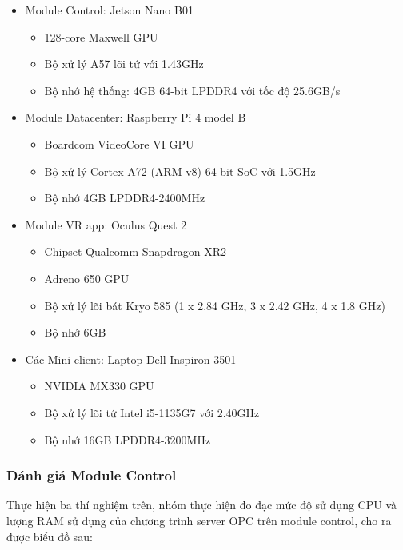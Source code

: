\begin{itemize}
    \item Module Control: Jetson Nano B01
    \begin{itemize}
        \item 128-core Maxwell GPU
        \item Bộ xử lý A57 lõi tứ với 1.43GHz
        \item Bộ nhớ hệ thống: 4GB 64-bit LPDDR4 với tốc độ 25.6GB/s
    \end{itemize}
    \item Module Datacenter: Raspberry Pi 4 model B
    \begin{itemize}
        \item Boardcom VideoCore VI GPU
        \item Bộ xử lý Cortex-A72 (ARM v8) 64-bit SoC với 1.5GHz
        \item Bộ nhớ 4GB LPDDR4-2400MHz
    \end{itemize}
    \item Module VR app: Oculus Quest 2
    \begin{itemize}
        \item Chipset Qualcomm Snapdragon XR2
        \item Adreno 650 GPU
        \item Bộ xử lý lõi bát Kryo 585 (1 x 2.84 GHz, 3 x 2.42 GHz, 4 x 1.8 GHz)
        \item Bộ nhớ 6GB
    \end{itemize}
    \item Các Mini-client: Laptop Dell Inspiron 3501
    \begin{itemize}
        \item NVIDIA MX330 GPU
        \item Bộ xử lý lõi tứ Intel i5-1135G7 với 2.40GHz
        \item Bộ nhớ 16GB LPDDR4-3200MHz
    \end{itemize}
\end{itemize}

\subsubsection{Đánh giá Module Control}

Thực hiện ba thí nghiệm trên, nhóm thực hiện đo đạc mức độ sử dụng CPU và lượng RAM sử dụng của chương trình server OPC trên module control, cho ra được biểu đồ sau:

